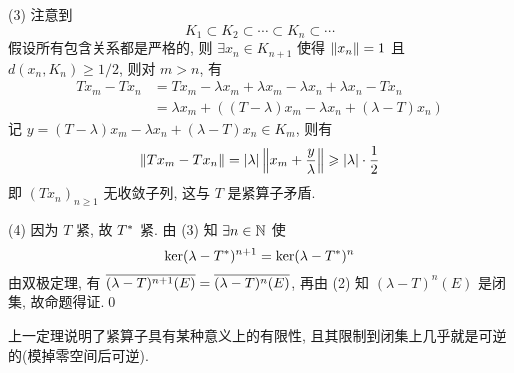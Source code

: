 \begin{Proof}
        (3) 注意到
        \[
            K_{1}\subset K_{2}\subset\cdots\subset K_{n}\subset\cdots
        \]
        假设所有包含关系都是严格的, 则 $ \exists x_{n}\in K_{n+1} $ 使得 $ \norm{x_{n}}=1 $ 且 $ d(x_{n}, K_{n})\geqslant1/2 $, 则对 $ m>n $, 有
        \[
            \begin{aligned}
                Tx_{m}-Tx_{n} & = Tx_{m}-\lambda x_{m}+\lambda x_{m}-\lambda x_{n}+\lambda x_{n}-Tx_{n}\\
                & = \lambda x_{m}+((T-\lambda)x_{m}-\lambda x_{n}+(\lambda-T)x_{n})
            \end{aligned}
        \]
        记 $ y=(T-\lambda)x_{m}-\lambda x_{n}+(\lambda-T)x_{n}\in K_{m} $, 则有
        \[
            \norm{Tx_{{m}}-Tx_{n}}=\abs{\lambda}\norm{x_{m}+\frac{y}{\lambda}}\geqslant\abs{\lambda}\cdot\frac{1}{2}
        \]
        即 $ (Tx_{n})_{n\geqslant1} $ 无收敛子列, 这与 $ T $ 是紧算子矛盾.

        (4) 因为 $ T $ 紧, 故 $ \Star{T} $ 紧. 由 (3) 知 $ \exists n\in\N $ 使
        \[
            \ker(\lambda-\Star{T})^{n+1}=\ker(\lambda-\Star{T})^{n}
        \]
        由双极定理, 有 $ \baro{(\lambda-T)^{n+1}(E)}=\baro{(\lambda-T)^{n}(E)} $, 再由 (2) 知 $ (\lambda-T)^{n}(E) $ 是闭集, 故命题得证.\qed
    \end{Proof}
    
    \begin{Remark}
        上一定理说明了紧算子具有某种意义上的有限性, 且其限制到闭集上几乎就是可逆的(模掉零空间后可逆).
    \end{Remark}

